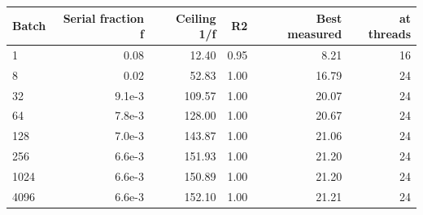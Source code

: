 \begin{tabular}{lrrrrr}
\toprule
Batch & Serial fraction f & Ceiling 1/f & R2 & Best measured & at threads \\
\midrule
1 & 0.08 & 12.40 & 0.95 & 8.21 & 16 \\
8 & 0.02 & 52.83 & 1.00 & 16.79 & 24 \\
32 & 9.1e-3 & 109.57 & 1.00 & 20.07 & 24 \\
64 & 7.8e-3 & 128.00 & 1.00 & 20.67 & 24 \\
128 & 7.0e-3 & 143.87 & 1.00 & 21.06 & 24 \\
256 & 6.6e-3 & 151.93 & 1.00 & 21.20 & 24 \\
1024 & 6.6e-3 & 150.89 & 1.00 & 21.20 & 24 \\
4096 & 6.6e-3 & 152.10 & 1.00 & 21.21 & 24 \\
\bottomrule
\end{tabular}
